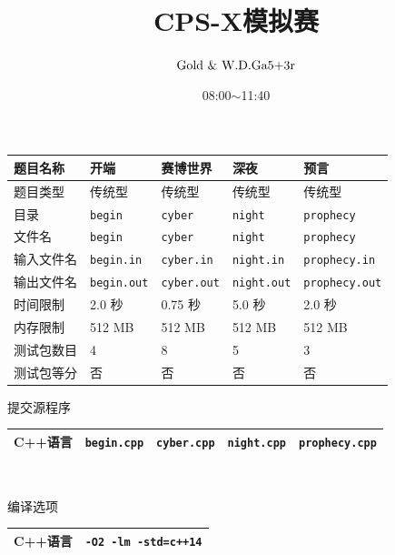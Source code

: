 \documentclass[12pt]{article}
\title{\Huge \textbf{CPS-X模拟赛}}
\author{$\text{Gold \& W.D.Ga5+3r}$}
\date{\heiti \Large{08:00$\sim$11:40}}
\begin{document}
\maketitle
\thispagestyle{fancy}
\pagestyle{fancy}
\renewcommand\headrulewidth{0pt}
\fancyhf{}
\begin{center}
    \begin{tabular}{|m{60pt}|m{78.9020375pt}|m{78.9020375pt}|m{88.9020375pt}|m{108.9020375pt}|}
        \hline 题目名称 & 开端 & 赛博世界 & 深夜 & 预言 \\
        \hline 题目类型 & 传统型 & 传统型 & 传统型 & 传统型 \\
        \hline 目录 & \lstinline|begin| & \lstinline|cyber| & \lstinline|night| & \lstinline|prophecy| \\
        \hline 文件名 & \lstinline|begin| & \lstinline|cyber| & \lstinline|night| & \lstinline|prophecy| \\
        \hline 输入文件名 & \lstinline|begin.in| & \lstinline|cyber.in|  & \lstinline|night.in|  & \lstinline|prophecy.in|  \\
        \hline 输出文件名 & \lstinline|begin.out| & \lstinline|cyber.out| & \lstinline|night.out| & \lstinline|prophecy.out| \\
        \hline 时间限制 & 2.0 秒 & 0.75 秒 & 5.0 秒 & 2.0 秒  \\
        \hline 内存限制 & 512 MB & 512 MB & 512 MB & 512 MB \\
        \hline 测试包数目 & 4 & 8 & 5 & 3 \\
        \hline 测试包等分 & 否 & 否 & 否 & 否 \\
        \hline
    \end{tabular}
\end{center}

提交源程序
\begin{center}
    \begin{tabular}{|m{60pt}|m{78.9020375pt}|m{78.9020375pt}|m{88.9020375pt}|m{108.9020375pt}|}
        \hline
        C++语言 & \lstinline|begin.cpp| & \lstinline|cyber.cpp| & \lstinline|night.cpp| & \lstinline|prophecy.cpp| \\
        \hline
    \end{tabular}\\
\end{center}

编译选项
\begin{center}
    \begin{tabular}{|m{60pt}|m{392.80814pt}<{\centering}|}
        \hline
        C++语言 & \lstinline|-O2 -lm -std=c++14| \\
        \hline
    \end{tabular}\\
\end{center}
\end{document}
